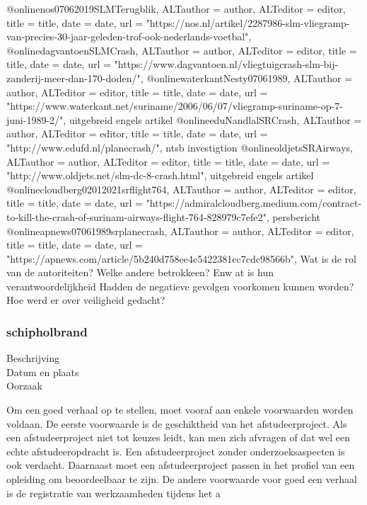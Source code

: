 {{@online{nos07062019SLMTerugblik,	ALTauthor = {author},	ALTeditor = {editor},	title = {title},	date = {date},	url = {"https://nos.nl/artikel/2287986-slm-vliegramp-van-precies-30-jaar-geleden-trof-ook-nederlands-voetbal"},}
@online{dagvantoenSLMCrash,	ALTauthor = {author},	ALTeditor = {editor},	title = {title},	date = {date},	url = {"https://www.dagvantoen.nl/vliegtuigcrash-slm-bij-zanderij-meer-dan-170-doden/"},}
@online{waterkantNesty07061989,	ALTauthor = {author},	ALTeditor = {editor},	title = {title},	date = {date},	url = {"https://www.waterkant.net/suriname/2006/06/07/vliegramp-suriname-op-7-juni-1989-2/"},}
uitgebreid engels artikel
@online{eduNandlalSRCrash,	ALTauthor = {author},	ALTeditor = {editor},	title = {title},	date = {date},	url = {"http://www.edufd.nl/planecrash/"},}
ntsb investigtion
@online{oldjetsSRAirways,	ALTauthor = {author},	ALTeditor = {editor},	title = {title},	date = {date},	url = {"http://www.oldjets.net/slm-dc-8-crash.html"},}
uitgebreid engels artikel
@online{cloudberg02012021srflight764,	ALTauthor = {author},	ALTeditor = {editor},	title = {title},	date = {date},	url = {"https://admiralcloudberg.medium.com/contract-to-kill-the-crash-of-surinam-airways-flight-764-828979c7efe2"},}
persbericht
@online{apnews07061989srplanecrash,	ALTauthor = {author},	ALTeditor = {editor},	title = {title},	date = {date},	url = {"https://apnews.com/article/5b240d758ee4c5422381cc7cdc98566b"},}
Wat is de rol van de autoriteiten?
Welke andere betrokkeen? Enw at is hun verantwoordelijkheid
Hadden de negatieve gevolgen voorkomen kunnen worden?
Hoe werd er over veiligheid gedacht?



\subsubsection{schipholbrand}

\begin{description}
	\item[Beschrijving]
	\item[Datum en plaats] 
	\item[Oorzaak]
\end{description}
Om een goed verhaal op te stellen, moet vooraf aan enkele voorwaarden
worden voldaan. De eerste voorwaarde is de geschiktheid van het
afstudeerproject. Als een afstudeerproject niet tot keuzes leidt, kan
men zich afvragen of dat wel een echte afstudeeropdracht is. Een
afstudeerproject zonder onderzoeksaspecten is ook verdacht. Daarnaast
moet een afstudeerproject passen in het profiel van een opleiding om
beoordeelbaar te zijn. De andere voorwaarde voor goed een verhaal is
de registratie van werkzaamheden tijdens het a


}}
